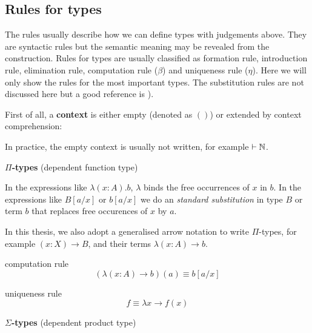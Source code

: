 \subsection{Rules for types}


The rules usually describe how we can define types with judgements above. They are syntactic rules but the semantic meaning may be revealed from the construction.
Rules for types are usually classified as formation rule, introduction rule, elimination rule, computation rule ($\beta$) and uniqueness rule ($\eta$). Here we will only show the rules for the most important types. The substitution rules are not discussed here but a good reference is \cite{hof:phd}).


First of all, a \textbf{context} is either empty (denoted as $()$) or extended by context comprehension:


In practice, the empty context is usually not written, for example $\vdash \mathbb{N}$.

\textbf{$\Pi$-types} (dependent function type)

\begin{multicols}{2}
\columnbreak
{}
\end{multicols}


In the expressions like $\lambda (x:A).b$, $\lambda$ binds the free occurrences of $x$ in $b$.
In the expressions like $B[a/x]$ or $b[a/x]$ we do an \emph{standard substitution} in type $B$ or term $b$ that replaces free occurences of $x$ by $a$.

In this thesis, we also adopt a generalised arrow notation to write $\Pi$-types, for example $(x : X) \to B$, and their terms $\lambda (x: A) \to b$.

\begin{multicols}{2}
computation rule
$$(\lambda (x:A) \to b)(a) \equiv b[a/x]$$

\columnbreak

uniqueness rule
$$f \equiv \lambda x \to f(x) $$
\end{multicols}

\textbf{$\Sigma$-types} (dependent product type)


